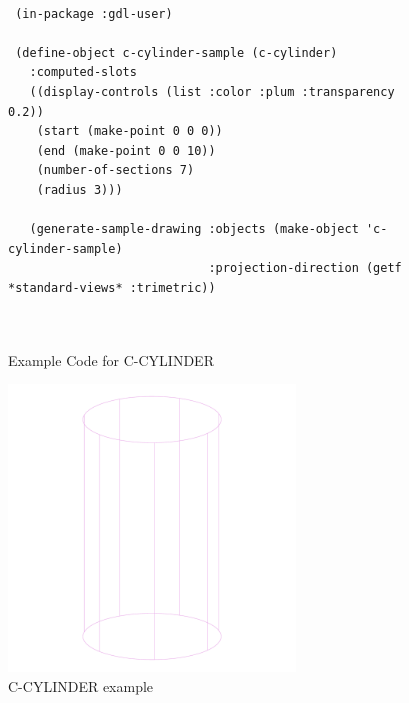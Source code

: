 \documentclass [11pt]{book}
\begin{document}
\begin{itemize}
\begin{figure}
\begin{lrbox}{\boxedverb}
\begin{minipage}{\linewidth}
{\small

\begin{verbatim}

 (in-package :gdl-user)

 (define-object c-cylinder-sample (c-cylinder)
   :computed-slots
   ((display-controls (list :color :plum :transparency 0.2))
    (start (make-point 0 0 0))
    (end (make-point 0 0 10))
    (number-of-sections 7)
    (radius 3)))

   (generate-sample-drawing :objects (make-object 'c-cylinder-sample)
                            :projection-direction (getf *standard-views* :trimetric))
   


\end{verbatim}}
\end{minipage}
\end{lrbox}
\fbox{\usebox{\boxedverb}}

\caption{Example Code for C-CYLINDER}

\label{fig:example-code-C-CYLINDER}

\end{figure}

\begin{figure}
\begin{center}
\includegraphics[width=3in,height=3in]{../images/example-C-CYLINDER.pdf}
\end{center}

\caption{C-CYLINDER example}

\label{fig:C-CYLINDER}

\end{figure}






\end{itemize}
\end{document}
